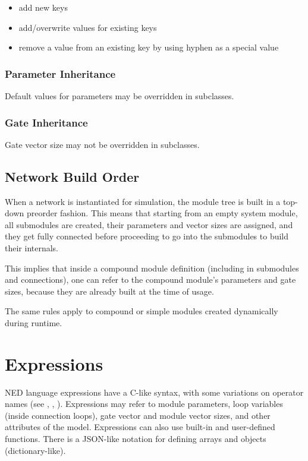 \begin{itemize}
    \item add new keys
    \item add/overwrite values for existing keys
    \item remove a value from an existing key by using hyphen as a special value
\end{itemize}


\subsubsection{Parameter Inheritance}
\label{sec:ned-ref:parameter-inheritance}

Default values for parameters may be overridden in subclasses.

\subsubsection{Gate Inheritance}
\label{sec:ned-ref:gate-inheritance}

Gate vector size may not be overridden in subclasses.


\subsection{Network Build Order}
\label{sec:ned-ref:build-order}

When a network is instantiated for simulation, the module tree is built in
a top-down preorder fashion. This means that starting from an empty system
module, all submodules are created, their parameters and vector sizes are
assigned, and they get fully connected before proceeding to go into the
submodules to build their internals.

This implies that inside a compound module definition (including in
submodules and connections), one can refer to the compound module's
parameters and gate sizes, because they are already built at the time of
usage.

The same rules apply to compound or simple modules created dynamically during
runtime.


\section{Expressions}
\label{sec:ned-ref:expressions}

NED language expressions have a C-like syntax, with some
variations on operator names (see \ttt{\textasciicircum}, \ttt{\#}, \ttt{\#\#}).
Expressions may refer to module parameters, loop variables (inside connection
 loops), gate vector and module vector sizes, and other attributes
of the model. Expressions can also use built-in and user-defined functions.
There is a JSON-like notation for defining arrays and objects (dictionary-like).

